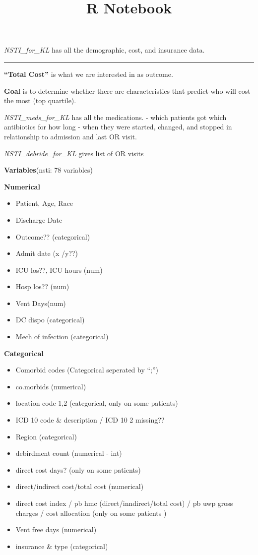 \documentclass[]{article}
\title{R Notebook}
\author{}
\date{}
\providecommand{\tightlist}{%
  \setlength{\itemsep}{0pt}\setlength{\parskip}{0pt}}
\begin{document}
\maketitle

\emph{NSTI\_for\_KL} has all the demographic, cost, and insurance data.

\begin{center}\rule{0.5\linewidth}{\linethickness}\end{center}

\textbf{``Total Cost''} is what we are interested in as outcome.

\textbf{Goal} is to determine whether there are characteristics that
predict who will cost the most (top quartile).

\emph{NSTI\_meds\_for\_KL} has all the medications. - which patients got
which antibiotics for how long - when they were started, changed, and
stopped in relationship to admission and last OR visit.

\emph{NSTI\_debride\_for\_KL} gives list of OR visits

\textbf{Variables}(nsti: 78 variables)

\textbf{Numerical}

\begin{itemize}
\tightlist
\item
  Patient, Age, Race
\item
  Discharge Date
\item
  Outcome?? (categorical)
\item
  Admit date (x /y??)
\item
  ICU los??, ICU hours (num)
\item
  Hosp los?? (num)
\item
  Vent Days(num)
\item
  DC dispo (categorical)
\item
  Mech of infection (categorical)
\end{itemize}

\textbf{Categorical}

\begin{itemize}
\item
  Comorbid codes (Categorical seperated by ``;'')
\item
  co.morbids (numerical)
\item
  location code 1,2 (categorical, only on some patients)
\item
  ICD 10 code \& description / ICD 10 2 missing??
\item
  Region (categorical)
\item
  debirdment count (numerical - int)
\item
  direct cost days? (only on some patients)
\item
  direct/indirect cost/total cost (numerical)
\item
  direct cost index / pb hmc (direct/inndirect/total cost) / pb uwp
  gross charges / cost allocation (only on some patients )
\item
  Vent free days (numerical)
\item
  insurance \& type (categorical)
\end{itemize}
\end{document}
